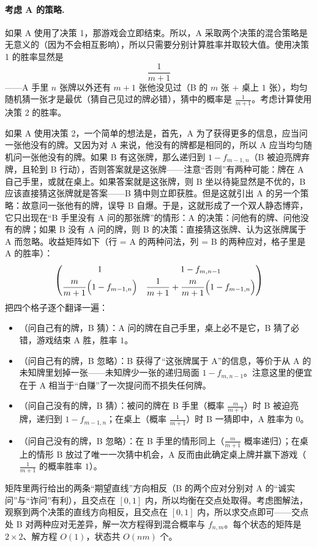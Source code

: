 \documentclass[UTF8,a4paper,11pt,oneside,openany,fontset=fandol]{ctexbook}
\theoremstyle{definition}
\begin{document}
\paragraph{考虑 A 的策略.} 如果 A 使用了决策 1，那游戏会立即结束。所以，A 采取两个决策的混合策略是无意义的（因为不会相互影响），所以只需要分别计算胜率并取较大值。使用决策 1 的胜率显然是
\[
 \frac{1}{m+1}
\]
——A 手里 $n$ 张牌以外还有 $m+1$ 张他没见过（B 的 $m$ 张 + 桌上 $1$ 张），均匀随机猜一张才是最优（猜自己见过的牌必错），猜中的概率是 $\tfrac1{m+1}$。考虑计算使用决策 2 的胜率。

如果 A 使用决策 2，一个简单的想法是，首先，A 为了获得更多的信息，应当问一张他没有的牌。又因为对 A 来说，他没有的牌都是相同的，所以 A 应当均匀随机问一张他没有的牌。如果 B 有这张牌，那么递归到 $1-f_{m-1,n}$（B 被迫亮牌弃牌，且轮到 B 行动），否则答案就是这张牌——注意“否则”有两种可能：牌在 A 自己手里，或就在桌上。如果答案就是这张牌，则 B 坐以待毙显然是不优的，B 应该直接猜这张牌就是答案——B 猜中则立即获胜。但是这就引出 A 的另一个策略：故意问一张他有的牌，误导 B 自爆。于是，这就形成了一个双人静态博弈，它只出现在“B 手里没有 A 问的那张牌”的情形：A 的决策：问他有的牌、问他没有的牌；如果 B 没有 A 问的牌，则 B 的决策：直接猜这张牌、认为这张牌属于 A 而忽略。收益矩阵如下（行 = A 的两种问法，列 = B 的两种应对，格子里是 A 的胜率）：
\[
 \begin{pmatrix}
 1 & 1-f_{m,n-1}\\[4pt]
 \dfrac{m}{m+1}\Bigl(1-f_{m-1,n}\Bigr) & \dfrac{1}{m+1}+\dfrac{m}{m+1}\Bigl(1-f_{m-1,n}\Bigr)
 \end{pmatrix}
\]
把四个格子逐个翻译一遍：
\begin{itemize}
\item （问自己有的牌，B 猜）：A 问的牌在自己手里，桌上必不是它，B 猜了必错，游戏结束 A 胜，胜率 $1$。
\item （问自己有的牌，B 忽略）：B 获得了“这张牌属于 A”的信息，等价于从 A 的未知牌里划掉一张——未知牌少一张的递归局面 $1-f_{m,n-1}$。注意这里的便宜在于 A 相当于“白赚”了一次提问而不损失任何牌。
\item （问自己没有的牌，B 猜）：被问的牌在 B 手里（概率 $\tfrac{m}{m+1}$）时 B 被迫亮牌，递归到 $1-f_{m-1,n}$；在桌上（概率 $\tfrac1{m+1}$）时 B 一猜即中，A 胜率为 $0$。
\item （问自己没有的牌，B 忽略）：在 B 手里的情形同上（$\tfrac{m}{m+1}$ 概率递归）；在桌上的情形 B 放过了唯一一次猜中机会，A 反而由此确定桌上牌并赢下游戏（$\tfrac1{m+1}$ 的概率胜率 $1$）。
\end{itemize}
矩阵里两行给出的两条“期望直线”方向相反（B 的两个应对分别对 A 的“诚实问”与“诈问”有利），且交点在 $[0,1]$ 内，所以均衡在交点处取得。考虑图解法，观察到两个决策的直线方向相反，且交点在 $[0,1]$ 内，所以求交点即可——交点处 B 对两种应对无差异，解一次方程得到混合概率与 $f_{n,m}$。每个状态的矩阵是 $2\times2$、解方程 $O(1)$，状态共 $O(nm)$ 个。
\end{document}
